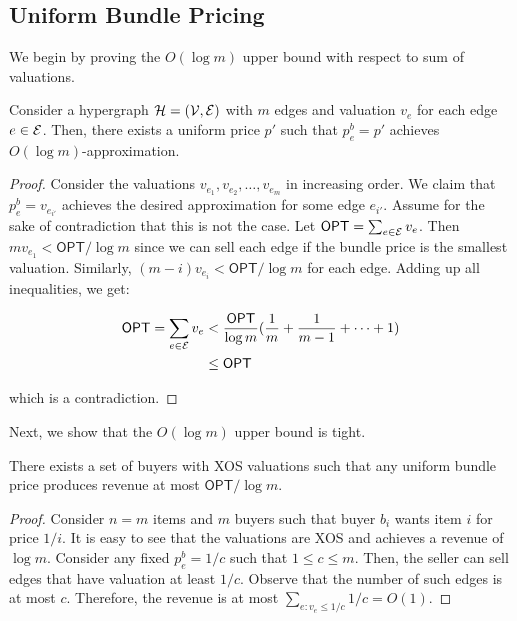 \subsection{Uniform Bundle Pricing}

We begin by proving the $O(\log m)$ upper bound with respect to sum of valuations. 

\begin{lemma}
	Consider a hypergraph $\mathcal{H} = (\mathcal{V}, \mathcal{E})$ with $m$ edges and valuation $v_e$ for each edge $e \in \mathcal{E}$. Then, there exists a uniform price $p'$ such that $p^{b}_e = p'$ achieves $O(\log m)$-approximation. 
\end{lemma}
\begin{proof}
	Consider the valuations $v_{e_1}, v_{e_2}, \dots, v_{e_m}$ in increasing order. We claim that $ p^{b}_e  = v_{e_{i'}}$ achieves the desired approximation for some edge $e_{i'}$. Assume for the sake of contradiction that this is not the case. Let $\textsf{OPT} = \sum_{e \in \mathcal{E}} v_e$. Then $m v_{e_1} < \textsf{OPT}/ \log m$ since we can sell each edge if the bundle price is the smallest valuation. Similarly, $(m - i) v_{e_i} < \textsf{OPT}/ \log m$ for each edge. Adding up all inequalities, we get:
	
	\begin{equation}
	\begin{aligned}
	\textsf{OPT} = \sum_{e \in \mathcal{E}} v_e & < \frac{\textsf{OPT}}{\log m} (\frac{1}{m} + \frac{1}{m-1} + \dots + 1) \\
	& \leq \textsf{OPT}
	\end{aligned}
	\end{equation}
	
	which is a contradiction.
\end{proof}

Next, we show that the $O(\log m)$ upper bound is tight.

\begin{lemma}
	There exists a set of buyers with XOS valuations such that any uniform bundle price produces revenue at most $\textsf{OPT}/ \log m$.
\end{lemma}	
\begin{proof}
	Consider $n=m$ items and $m$ buyers such that buyer $b_i$ wants item $i$ for price $1/i$. It is easy to see that the valuations are XOS and achieves a revenue of $\log m$. Consider any fixed $p^b_e = 1/c$ such that $1 \leq c \leq m$. Then, the seller can sell edges that have valuation at least $1/c$. Observe that the number of such edges is at most $c$. Therefore, the revenue is at most $\sum_{e:v_e \leq 1/c} 1/c = O(1)$.
\end{proof}


